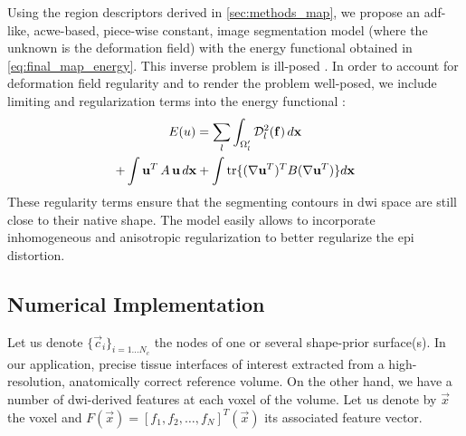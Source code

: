 {\color{red} {Using the region descriptors derived in \autoref{sec:methods_map}, we propose
an \gls{adf}-like, \gls{acwe}-based, piece-wise constant, image segmentation
model (where the unknown is the deformation field)
\cite{chan_active_2001} with the energy functional obtained in
\eqref{eq:final_map_energy}. This inverse problem is ill-posed
\cite{bertero_illposed_1988,hadamard_sur_1902}.
In order to account for deformation field regularity and to render the
problem well-posed, we include limiting and regularization terms into
the energy functional \cite{morozov_linear_1975,tichonov_solution_1963}:
%
\begin{multline}
E(u) = \sum\limits_l \int_{\Omega'_l} \mdist{f}{l} \,d\vec{x} \\
+ \int \vec{u}^T \, A \, \vec{u} \, d\vec{x} + \int \tr\{(\nabla \vec{u}^T)^T B (\nabla \vec{u}^T)\} d\vec{x}
\label{eq:complete_energy}
\end{multline}
%
These regularity terms ensure that the segmenting contours in
\gls{dwi} space are still close to their native shape. The model
easily allows to incorporate inhomogeneous and anisotropic
regularization \cite{nagel_investigation_1986} to better regularize
the \gls{epi} distortion.}}


\subsection{Numerical Implementation}
\label{sec:numerical_implementation}
%
Let us denote $\{\vec{c}_i\}_{i=1 \ldots N_c}$ the nodes of one or several shape-prior
surface(s). In our application, precise tissue interfaces of interest
extracted from a high-resolution, anatomically correct reference volume.
On the other hand, we have a number of \gls{dwi}-derived features at each
voxel of the volume. Let us denote by $\vec{x}$ the voxel and $F(\vec{x}) =
[ f_1, f_2, \ldots, f_N]^T(\vec{x})$ its associated feature vector.

